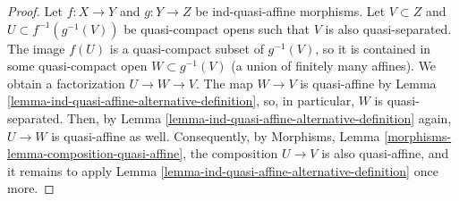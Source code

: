 \documentclass[10pt,a4paper]{amsart}
\theoremstyle{plain}
\theoremstyle{definition}
\theoremstyle{remark}
\numberwithin{equation}{subsection}
\begin{document}
\begin{proof}
Let $f : X \to Y$ and $g : Y \to Z$ be ind-quasi-affine morphisms.
Let $V \subset Z$ and $U \subset f^{-1}(g^{-1}(V))$ be quasi-compact
opens such that $V$ is also quasi-separated. The image $f(U)$ is a
quasi-compact subset of $g^{-1}(V)$, so it is contained in some
quasi-compact open $W \subset g^{-1}(V)$ (a union of finitely many affines).
We obtain a factorization $U \to W \to V$. The map $W \to V$ is quasi-affine
by Lemma \ref{lemma-ind-quasi-affine-alternative-definition}, so, in
particular, $W$ is quasi-separated. Then, by
Lemma \ref{lemma-ind-quasi-affine-alternative-definition} again, $U \to W$
is quasi-affine as well. Consequently, by Morphisms,
Lemma \ref{morphisms-lemma-composition-quasi-affine}, the composition
$U \to V$ is also quasi-affine, and it remains to apply
Lemma \ref{lemma-ind-quasi-affine-alternative-definition} once more.
\end{proof}
\end{document}
